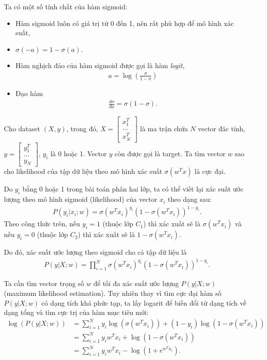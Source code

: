 \documentclass{book}
\begin{document}
Ta có một số tính chất của hàm sigmoid:
\begin{itemize}
\item Hàm sigmoid luôn có giá trị từ 0 đến 1, nên rất phù hợp để mô hình xác suất,
\item $\sigma(-a) = 1-\sigma(a)$.
\item Hàm nghịch đảo của hàm sigmoid được gọi là hàm \emph{logit}, 
\begin{align*}
a=\log(\frac{\sigma}{1-\sigma}) 
\end{align*}
\item Đạo hàm 
\begin{align*}
\frac{d \sigma}{da} = \sigma (1- \sigma).
\end{align*}
\end{itemize}

Cho dataset $(X, y)$, trong đó, $X = \begin{bmatrix} x_1^T \\ ... \\ x_N^T \end{bmatrix}$ là ma trận chứa $N$ vector đăc tính, $y = \begin{bmatrix} y_1^T \\ ... \\ y_N \end{bmatrix}$, $y_i$ là 0 hoặc 1. Vector $y$ còn được gọi là target. 
Ta tìm vector $w$ sao cho likelihood của tập dữ liệu theo mô hình xác suất $ \sigma(w^T x)$ là cực đại.

Do $y_i$ bằng 0 hoặc 1 trong bài toán phân hai lớp, ta có thể viết lại xác suất ước lượng theo mô hình sigmoid (likelihood) của vector $x_i$ theo dạng sau:
\begin{align}
P(y_i | x_i;w) = \sigma(w^T x_i)^{y_i} (1-\sigma(w^T x_i))^{1-y_i}.
\end{align} 
Theo công thức trên, nếu $y_i = 1$ (thuộc lớp $C_1$) thì xác xuất sẽ là $\sigma(w^T x_i)$ và nếu $y_i = 0$ (thuộc lớp $C_2$) thì xác xuất sẽ là $1-\sigma(w^T x_i)$.

Do đó, xác suất ước lượng theo sigmoid cho cả tập dữ liệu là
\begin{align}
P(y | X ;w) = \prod_{i=1}^N \sigma(w^T x_i)^{y_i} (1-\sigma(w^T x_i))^{1-y_i}.
\label{eq:likelihood}
\end{align} 

Ta cần tìm vector trọng số $w$ để tối đa xác suất ước lượng $P(y | X ;w)$ (maximum likelihood estimation).
Tuy nhiên thay vì tìm cực đại hàm số $P(y | X ;w)$ có dạng tích khá phức tạp, ta lấy logarit để biến đổi từ dạng tích về dạng tổng và tìm cực trị của hàm mục tiêu mới:
\begin{align*}
\log(P(y | X ;w)) &= \sum_{i=1}^N y_i \log(\sigma(w^T x_i)) + (1-y_i)\log (1-\sigma(w^T x_i))\\
				& = \sum_{i=1}^N y_i w^T x_i + \log (1-\sigma(w^T x_i)) \\
				& = \sum_{i=1}^N y_i w^T x_i - \log (1 + e^{w^T x_i}).
\end{align*}
\end{document}
